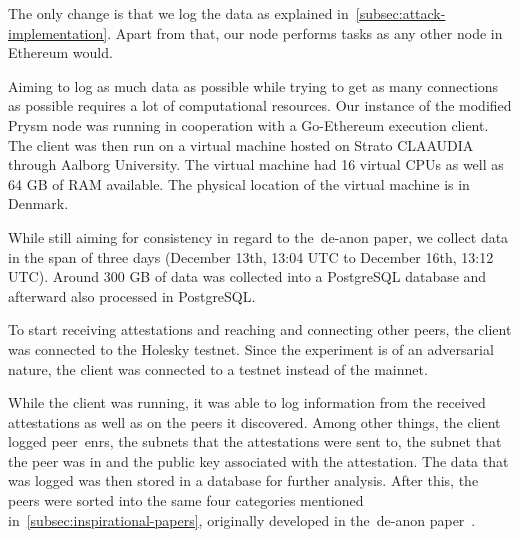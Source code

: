 The only change is that we log the data as explained in~\autoref{subsec:attack-implementation}.
Apart from that, our node performs tasks as any other node in Ethereum would.


Aiming to log as much data as possible while trying to get as many connections as possible requires a lot of computational resources.
Our instance of the modified Prysm node was running in cooperation with a Go-Ethereum execution client.
The client was then run on a virtual machine hosted on Strato CLAAUDIA through Aalborg University.
The virtual machine had 16 virtual CPUs as well as 64 GB of RAM available.
The physical location of the virtual machine is in Denmark.

While still aiming for consistency in regard to the~\gls{de-anon paper}, we collect data in the span of three days (December 13th, 13:04 UTC to December 16th, 13:12 UTC).
Around 300 GB of data was collected into a PostgreSQL database and afterward also processed in PostgreSQL\@.


To start receiving attestations and reaching and connecting other peers,
the client was connected to the Holesky testnet.
Since the experiment is of an adversarial nature, the client was connected to a testnet instead of the mainnet.

While the client was running,
it was able to log information from the received attestations as well as on the peers it discovered.
Among other things, the client logged peer~\glspl{enr}, the subnets that the attestations were sent to,
the subnet that the peer was in and the public key associated with the attestation.
The data that was logged was then stored in a database for further analysis.
After this,
the peers were sorted into the same four categories mentioned in~\autoref{subsec:inspirational-papers}, originally developed in the~\gls{de-anon paper}~\cite{heimbach2024deanonymizingethereumvalidatorsp2p}.